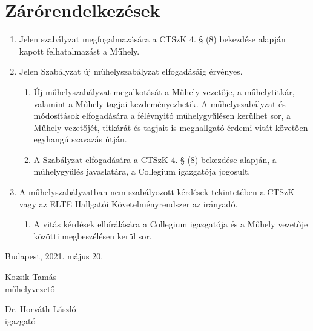 \documentclass{../styles/rulebook}
\begin{document}
\section{Zárórendelkezések}

\begin{enumerate}
	\item Jelen szabályzat megfogalmazására a CTSzK 4. § (8) bekezdése alapján kapott felhatalmazást a Műhely.
	\item Jelen Szabályzat új műhelyszabályzat elfogadásáig érvényes.
	\begin{enumerate}
		\item Új műhelyszabályzat megalkotását a Műhely vezetője, a műhelytitkár, valamint a Műhely tagjai kezdeményezhetik. A műhelyszabályzat és módosítások elfogadására a félévnyitó műhelygyűlésen kerülhet sor, a Műhely vezetőjét, titkárát és tagjait is meghallgató érdemi vitát követően egyhangú szavazás útján.
		\item A Szabályzat elfogadására a CTSzK 4. § (8) bekezdése alapján, a műhelygyűlés javaslatára, a Collegium igazgatója jogosult.
	\end{enumerate}
	\item A műhelyszabályzatban nem szabályozott kérdések tekintetében a CTSzK vagy az ELTE Hallgatói Követelményrendszer az irányadó.
	\begin{enumerate}
		\item A vitás kérdések elbírálására a Collegium igazgatója és a Műhely vezetője közötti megbeszélésen kerül sor.
	\end{enumerate}
\end{enumerate}

\vspace{0.3in}
Budapest, 2021. május 20.
\vspace{0.6in}

\begin{minipage}{3in}
\begin{center}
Kozsik Tamás\\
műhelyvezető
\end{center}
\end{minipage}
\begin{minipage}{3in}
\begin{center}
Dr. Horváth László\\
igazgató
\end{center}
\end{minipage}
\end{document}
